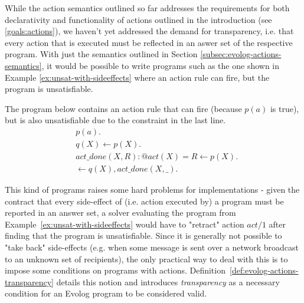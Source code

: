 
While the action semantics outlined so far addresses the requirements for both declarativity and functionality of actions outlined in the introduction (see \ref{goals:actions}), we haven't yet addressed the demand for transparency, i.e. that every action that is executed must be reflected in an aswer set of the respective program. With just the semantics outlined in Section \ref{subsec:evolog-actions-semantics}, it would be possible to write programs such as the one shown in Example \ref{ex:unsat-with-sideeffects} where an action rule can fire, but the program is unsatisfiable.

\begin{example}
\label{ex:unsat-with-sideeffects}
The program below contains an action rule that can fire (because $p(a)$ is true), but is also unsatisfiable due to the constraint in the last line.
\begin{align*}
	&p(a). \\
	&q(X) \leftarrow p(X). \\
	&act\_done(X, R) : @act(X) = R \leftarrow p(X). \\
	&\leftarrow q(X), act\_done(X, \_).
\end{align*}
\end{example}

This kind of programs raises some hard problems for implementations - given the contract that every side-effect of (i.e. action executed by) a program must be reported in an answer set, a solver evaluating the program from Example~\ref{ex:unsat-with-sideeffects} would have to "retract" action $act/1$ after finding that the program is unsatisfiable. Since it is generally not possible to "take back" side-effects (e.g. when some message is sent over a network broadcast to an unknown set of recipients), the only practical way to deal with this is to impose some conditions on programs with actions. Definition~\ref{def:evolog-actions-transparency} details this notion and introduces \emph{transparency} as a necessary condition for an Evolog program to be considered valid.

